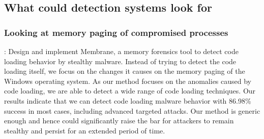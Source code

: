 \documentclass{article}
\begin{document}
\subsection{What could detection systems look for}

\subsubsection{\textcite{Pek:2016} Looking at memory paging of compromised processes}
\textbf{}: Design and implement Membrane, a memory forensics tool to detect code loading behavior by stealthy malware. Instead of trying to detect the code loading itself, we focus on the changes it causes on the memory paging of the Windows operating system. As our method focuses on the anomalies caused by code loading, we are able to detect a wide range of code loading techniques. Our results indicate that we can detect code loading malware behavior with 86.98\% success in most cases, including advanced targeted attacks. Our method is generic enough and hence could significantly raise the bar for attackers to remain stealthy and persist for an extended period of time.
\end{document}
